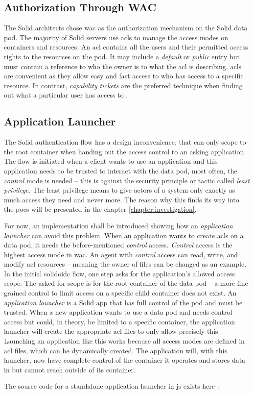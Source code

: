 \subsection{Authorization Through WAC}

The Solid architects chose \gls{wac} \cite{wac} as the authorization mechanism on the Solid data pod. The majority of Solid servers use \glspl{acl} to manage the access modes on containers and resources. An \gls{acl} contains all the users and their permitted access rights to the resources on the pod. It may include a \textit{default} or \textit{public} entry but must contain a reference to who the owner is to what the \gls{acl} is describing. \glspl{acl} are convenient as they allow easy and fast access to who has access to a specific resource. In contrast, \textit{capability tickets} are the preferred technique when finding out what a particular user has access to \cite{stallings}.

\subsection{Application Launcher}

The Solid authentication flow has a design inconvenience, that can only scope to the root container when handing out the access control to an asking application. The flow is initiated when a client wants to use an application and this application needs to be trusted to interact with the data pod, most often, the \textit{control} mode is needed -- this is against the security principle or tactic called \textit{least privilege}. The least privilege means to give actors of a system only exactly as much access they need and never more. The reason why this finds its way into the \glspl{poc} will be presented in the chapter \ref{chapter:investigation}.

For now, an implementation shall be introduced showing how an \textit{application launcher} can avoid this problem. When an application wants to create \glspl{acl} on a data pod, it needs the before-mentioned \textit{control} access. \textit{Control} access is the highest access mode in \gls{wac}. An agent with \textit{control} access can read, write, and modify \gls{acl} resources -- meaning the owner of files can be changed as an example.
In the initial \gls{solidoidc} flow, one step asks for the application's allowed access scope. The asked for scope is for the root container of the data pod -- a more fine-grained control to limit access on a specific child container does not exist. An \textit{application launcher} is a Solid app that has full control of the pod and must be trusted. When a new application wants to use a data pod and needs control access but could, in theory, be limited to a specific container, the application launcher will create the appropriate \gls{acl} files to only allow precisely this.
Launching an application like this works because all access modes are defined in \gls{acl} files, which can be dynamically created. The application will, with this launcher, now have complete control of the container it operates and stores data in but cannot reach outside of its container.

The source code for a standalone application launcher in \gls{js} exists here \cite{app-launcher}.
